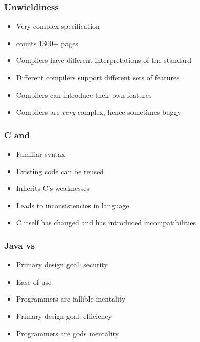 \begin{frame}
  \frametitle{Unwieldiness}
  \begin{itemize}
    \item Very complex specification
    \item {}
          counts 1300+ pages 
    \item Compilers have different interpretations of the standard
    \item Different compilers support different sets of features
    \item Compilers can introduce their own features
    \item Compilers are \emph{very} complex, hence sometimes buggy
  \end{itemize}
\end{frame}

\begin{frame}
  \frametitle{C and \cpp}
  \begin{itemize}
    \item Familiar syntax
    \item Existing code can be reused
  \end{itemize}
  \vskip5mm
  \begin{itemize}
    \item Inherits C's weaknesses
    \item Leads to inconsistencies in language
  \end{itemize}
  \vskip5mm
  \begin{itemize}
    \item C itself has changed and has introduced incompatibilities
  \end{itemize}
\end{frame}

\begin{frame}
  \frametitle{Java vs \cpp}
  \begin{itemize}
    \item Primary design goal: security
    \item Ease of use
    \item Programmers are fallible mentality
  \end{itemize}
  \vskip5mm
  \structure{\cpp}
  \begin{itemize}
    \item Primary design goal: efficiency
    \item Programmers are gods mentality
  \end{itemize}
\end{frame}

